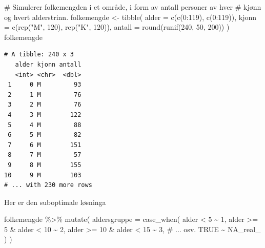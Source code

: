\documentclass[
  letterpaper,
  DIV=11,
  numbers=noendperiod]{scrreprt}
\newenvironment{Shaded}{\begin{snugshade}}{\end{snugshade}}
\newcommand{\AttributeTok}[1]{\textcolor[rgb]{0.40,0.45,0.13}{#1}}
\newcommand{\CommentTok}[1]{\textcolor[rgb]{0.37,0.37,0.37}{#1}}
\newcommand{\ConstantTok}[1]{\textcolor[rgb]{0.56,0.35,0.01}{#1}}
\newcommand{\DecValTok}[1]{\textcolor[rgb]{0.68,0.00,0.00}{#1}}
\newcommand{\FunctionTok}[1]{\textcolor[rgb]{0.28,0.35,0.67}{#1}}
\newcommand{\NormalTok}[1]{\textcolor[rgb]{0.00,0.23,0.31}{#1}}
\newcommand{\OtherTok}[1]{\textcolor[rgb]{0.00,0.23,0.31}{#1}}
\newcommand{\SpecialCharTok}[1]{\textcolor[rgb]{0.37,0.37,0.37}{#1}}
\newcommand{\StringTok}[1]{\textcolor[rgb]{0.13,0.47,0.30}{#1}}
\begin{document}
\begin{Shaded}
\begin{Highlighting}[]
\CommentTok{\# Simulerer folkemengden i et område, i form av antall personer av hver }
\CommentTok{\# kjønn og hvert alderstrinn.}
\NormalTok{folkemengde }\OtherTok{\textless{}{-}} \FunctionTok{tibble}\NormalTok{(}
  \AttributeTok{alder =} \FunctionTok{c}\NormalTok{(}\FunctionTok{c}\NormalTok{(}\DecValTok{0}\SpecialCharTok{:}\DecValTok{119}\NormalTok{), }\FunctionTok{c}\NormalTok{(}\DecValTok{0}\SpecialCharTok{:}\DecValTok{119}\NormalTok{)),}
  \AttributeTok{kjonn =} \FunctionTok{c}\NormalTok{(}\FunctionTok{rep}\NormalTok{(}\StringTok{"M"}\NormalTok{, }\DecValTok{120}\NormalTok{), }\FunctionTok{rep}\NormalTok{(}\StringTok{"K"}\NormalTok{, }\DecValTok{120}\NormalTok{)),}
  \AttributeTok{antall =} \FunctionTok{round}\NormalTok{(}\FunctionTok{runif}\NormalTok{(}\DecValTok{240}\NormalTok{, }\DecValTok{50}\NormalTok{, }\DecValTok{200}\NormalTok{))}
\NormalTok{)}
\NormalTok{folkemengde}
\end{Highlighting}
\end{Shaded}

\begin{verbatim}
# A tibble: 240 x 3
   alder kjonn antall
   <int> <chr>  <dbl>
 1     0 M         93
 2     1 M         76
 3     2 M         76
 4     3 M        122
 5     4 M         88
 6     5 M         82
 7     6 M        151
 8     7 M         57
 9     8 M        155
10     9 M        103
# ... with 230 more rows
\end{verbatim}

Her er den suboptimale løsninga

\begin{Shaded}
\begin{Highlighting}[]
\NormalTok{folkemengde }\SpecialCharTok{\%\textgreater{}\%} 
  \FunctionTok{mutate}\NormalTok{(}
    \AttributeTok{aldersgruppe =} \FunctionTok{case\_when}\NormalTok{(}
\NormalTok{      alder }\SpecialCharTok{\textless{}} \DecValTok{5} \SpecialCharTok{\textasciitilde{}} \DecValTok{1}\NormalTok{, }
\NormalTok{      alder }\SpecialCharTok{\textgreater{}=} \DecValTok{5} \SpecialCharTok{\&}\NormalTok{ alder }\SpecialCharTok{\textless{}} \DecValTok{10} \SpecialCharTok{\textasciitilde{}} \DecValTok{2}\NormalTok{,}
\NormalTok{      alder }\SpecialCharTok{\textgreater{}=} \DecValTok{10} \SpecialCharTok{\&}\NormalTok{ alder }\SpecialCharTok{\textless{}} \DecValTok{15} \SpecialCharTok{\textasciitilde{}} \DecValTok{3}\NormalTok{,}
      \CommentTok{\# ... osv.}
      \ConstantTok{TRUE} \SpecialCharTok{\textasciitilde{}} \ConstantTok{NA\_real\_}
\NormalTok{    )}
\NormalTok{  )}
\end{Highlighting}
\end{Shaded}
\end{document}
